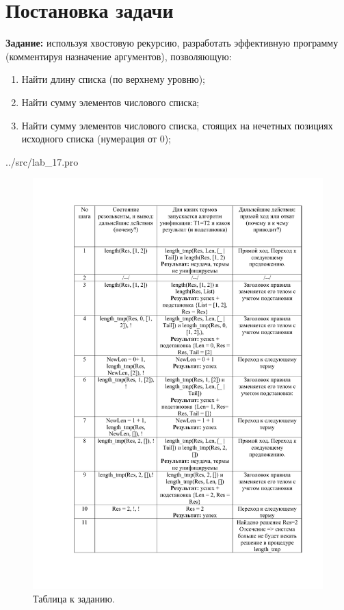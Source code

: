 \section*{Постановка задачи}

\textbf{Задание:} используя хвостовую рекурсию, разработать эффективную программу (комментируя назначение аргументов), позволяющую:
\begin{enumerate}
	\item Найти длину списка (по верхнему уровню);
	\item Найти сумму элементов числового списка;
	\item Найти сумму элементов числового списка, стоящих на нечетных позициях исходного списка (нумерация от 0);
\end{enumerate}

\begin{lstinputlisting}[label=third,caption=Решение задания №1, language=prolog, firstline=1, lastline=47]{../src/lab_17.pro}
\end{lstinputlisting}

\begin{figure}[H]
	\caption{Таблица к заданию.}
	\begin{center}
		\includegraphics[scale=0.85]{img/16.1.pdf}
	\end{center}
	
\end{figure}
